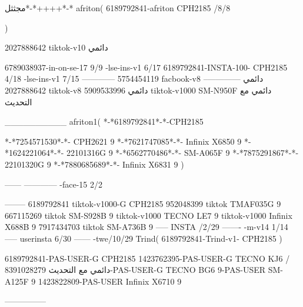 مجثثل*-*++++*-*
afriton(
6189792841-afriton CPH2185  /8/8

)

2027888642 tiktok-v10
دائمي

6789038937-in-on-se-17 9/9
-lse-ins-v1 6/17
6189792841-INSTA-100- CPH2185 4/18
-lse-ins-v1 7/15
------------
5754454119 facbook-v8
دائمي
--------------
2027888642 tiktok-v8
دائمي
5909533996 tiktok-v1000  SM-N950F
دائمي مع التحديث

__________
afriton1(
*-*6189792841*-*-CPH2185

*-*7254571530*-*- CPH2621   9\6
*-*7621747085*-*- Infinix X6850   9\6
*-*1624221064*-*- 22101316G   9\9
*-*6562770486*-*- SM-A065F   9
*-*7875291867*-*- 22101320G   9\7
*-*7880685689*-*- Infinix X6831   9
)


------
------------
-face-15 2/2

--------
6189792841 tiktok-v1000-G CPH2185 
952048399 tiktok TMAF035G 9
667115269 tiktok  SM-S928B  9 tiktok-v1000  TECNO LE7  9 tiktok-v1000  Infinix X688B  9
7917434703 tiktok  SM-A736B  9
-----
 INSTA /2/29
-------
-m-v14 1/14
-----
userinsta 6/30
------
-twe/10/29
Trind(
6189792841-Trind-v1- CPH2185 
)


6189792841-PAS-USER-G CPH2185 
1423762395-PAS-USER-G TECNO KJ6  /دائمي مع التحديث
8391028279-PAS-USER-G  TECNO BG6  9-PAS-USER  SM-A125F  9
1423822809-PAS-USER   Infinix X6710  9

    ---------------
